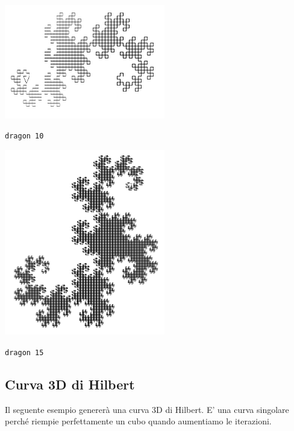 \begin{center}
	\begin{minipage}{7cm}
		\includegraphics[width=7cm]{pics/linden-dragon10.png}
		\begin{center}
			\texttt{dragon 10}
		\end{center}
	\end{minipage}
	\begin{minipage}{7cm}
		\includegraphics[width=7cm]{pics/linden-dragon15.png}
		\begin{center}
			\texttt{dragon 15}
		\end{center}
	\end{minipage}
\end{center}


\subsection{Curva 3D di Hilbert}
Il seguente esempio genererà una curva 3D di Hilbert. E' una curva singolare perché riempie perfettamente un cubo quando aumentiamo le iterazioni.\\

